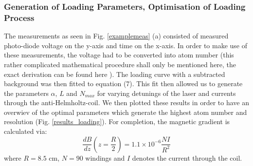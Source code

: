 \documentclass[12pt, a4paper]{article}
\begin{document}
\subsubsection{Generation of Loading Parameters, Optimisation of Loading Process}
The measurements as seen in Fig. \ref{examplemeas} (a) consisted of measured photo-diode voltage on the y-axis and time on the x-axis. In order to make use of these measurements, the voltage had to be converted into atom number (this rather complicated mathematical procedure shall only be mentioned here, the exact derivation can be found here \cite{script}). The loading curve with a subtracted background was then fitted to equation (7). This fit then allowed us to generate the parameters $\alpha$, $L$ and $N_{max}$ for varying detunings of the laser and currents through the anti-Helmholtz-coil. We then plotted these results in order to have an overwiev of the optimal parameters which generate the highest atom number and resolution (Fig. \ref{results_loading}). For completion, the magnetic gradient is calculated via:
\begin{equation}
\frac{dB}{dz}(z=\frac{R}{2})=1.1\times 10^{-6}\frac{NI}{R^2}
\end{equation}
where $R=8.5$ cm, $N=90$ windings and $I$ denotes the current through the coil.
\end{document}
